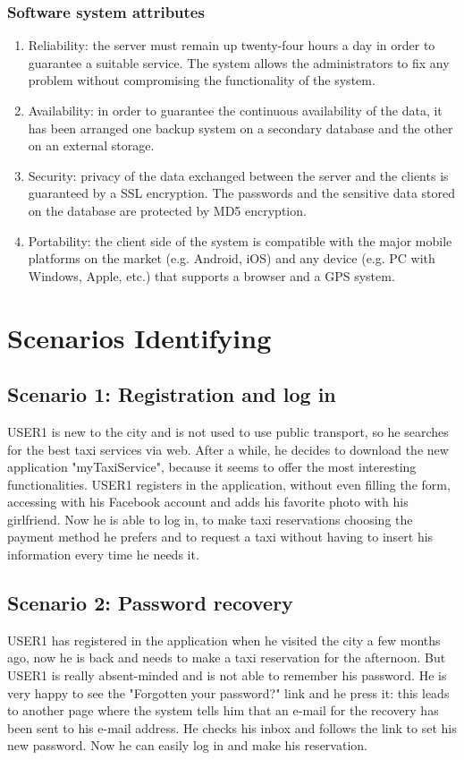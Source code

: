 \documentclass[18pt,oneside,a4paper, titlepage]{article}
\begin{document}
		\subsubsection{Software system attributes} 
			\begin{enumerate}
				\item Reliability: the server must remain up twenty-four hours a day in order to guarantee a suitable service. The system allows the administrators to fix any problem without compromising the functionality of the system.
				\item Availability: in order to guarantee the continuous availability of the data, it has been arranged one backup system on a secondary database and the other on an external storage. 
				\item Security: privacy of the data exchanged between the server and the clients is guaranteed by a SSL encryption. The passwords and the sensitive data stored on the database are protected by MD5 encryption.
				\item Portability: the client side of the system is compatible with the major mobile platforms on the market (e.g. Android, iOS) and any device (e.g. PC with Windows, Apple, etc.) that supports a browser and a GPS system.
			\end{enumerate}
\newpage
\section{Scenarios Identifying}
	\subsection{Scenario 1: Registration and log in}
		USER1 is new to the city and is not used to use public transport, so he searches for the best taxi services via web. After a while, he decides to download the new application "myTaxiService", because it seems to offer the most interesting functionalities. USER1 registers in the application, without even filling the form, accessing with his Facebook account and adds his favorite photo with his girlfriend. Now he is able to log in, to make taxi reservations choosing the payment method he prefers and to request a taxi without having to insert his information every time he needs it.
		
	\subsection{Scenario 2: Password recovery}
		USER1 has registered in the application when he visited the city a few months ago, now he is back and needs to make a taxi reservation for the afternoon. But USER1 is really absent-minded and is not able to remember his password. He is very happy to see the "Forgotten your password?" link and he press it: this leads to another page where the system tells him that an e-mail for the recovery has been sent to his e-mail address. He checks his inbox and follows the link to set his new password. Now he can easily log in and make his reservation.
		
\end{document}
